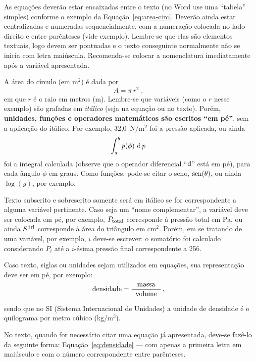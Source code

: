 \documentclass[12pt, a4paper, twoside, twocolumn]{article}
\begin{document}
As equações deverão estar encaixadas entre o texto (no Word use uma ``tabela'' simples) conforme o exemplo da Equação~\eqref{eq:area-circ}. Deverão ainda estar centralizadas e numeradas sequencialmente, com a numeração colocada no lado direito e entre parênteses (vide exemplo). Lembre-se que elas são elementos textuais, logo devem ser pontuadas e o texto conseguinte normalmente não se inicia com letra maiúscula. Recomenda-se colocar a nomenclatura imediatamente após a variável apresentada.

A área do círculo (em m$^2$) é dada por 
\begin{equation}
	A = \pi \, r^2\;,
\label{eq:area-circ}
\end{equation}
%
em que $r$ é o raio em metros (m). Lembre-se que variáveis (como o $r$ nesse exemplo) são grafadas em \textit{itálico} (seja na equação ou no texto). Porém, \textbf{unidades, funções e operadores matemáticos são escritos ``em pé''}, sem a aplicação do itálico. Por exemplo, 32,0~N/m$^2$ foi a pressão aplicada, ou ainda
%
\begin{equation}
	\int_a^b p(\phi)\, \operatorname{d} p\,
\label{eq:int}
\end{equation}
%
foi a integral calculada (observe que o operador diferencial ``$\text{d}$'' está em pé), para cada ângulo $\phi$ em graus. Como funções, pode-se citar o seno, $\operatorname{sen}(\theta)$, ou ainda $\log(y)$, por exemplo. 
%

Texto subscrito e sobrescrito somente será em itálico se for correspondente a alguma variável pertinente. Caso seja um ``nome complementar'', a variável deve ser colocada em pé, por exemplo, $P_{\text{total}}$ corresponde à pressão total em Pa, ou ainda $S^{\text{\,tri}}$ corresponde à área do triângulo em cm$^2$. Porém, em se tratando de uma variável, por exemplo, $i$ deve-se escrever: o somatório foi calculado considerando $P_i$ até a $i$-ésima pressão final correspondente a 256.

Caso texto, siglas ou unidades sejam utilizados em equações, sua representação deve ser em pé, por exemplo:
%
\begin{equation}
	\text{densidade} = \frac{\text{massa}}{\;\;\text{volume}\;\;}\,,
\label{eq:densidade}
\end{equation}

sendo que no SI (Sistema Internacional de Unidades) a unidade de densidade é o quilograma por metro cúbico (kg/m$^3$).
%

No texto, quando for necessário citar uma equação já apresentada, deve-se fazê-lo da seguinte forma: Equação~\eqref{eq:densidade} --- com apenas a primeira letra em maiúsculo e com o número correspondente entre parênteses.
\end{document}
